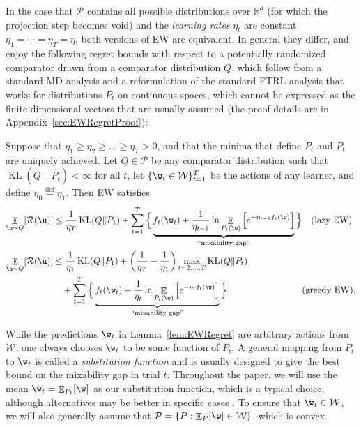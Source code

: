 \documentclass{colt2018} %
\DeclareMathOperator*{\E}{\mathbb{E}}
\DeclareMathOperator{\kl}{KL}
\newcommand{\reals}{\mathbb{R}}
\newcommand{\domainP}{\mathcal{P}}
\newcommand{\domainw}{\mathcal{W}}
\newcommand{\regret}{\mathcal{R}}
\begin{document}
% 
In the case that $\domainP$ contains all possible distributions over
$\reals^d$ (for which the projection step becomes void) and the
\emph{learning rates} $\eta_t$ are constant $\eta_1 = \cdots = \eta_T =
\eta$, both versions of EW are equivalent. In general they differ, and
enjoy the following regret bounds with respect to a potentially
randomized comparator drawn from a comparator distribution $Q$, which
follow from a standard MD analysis \citep{hazan2016introduction}
and a reformulation of the standard FTRL analysis that works for
distributions $P_t$ on continuous spaces, which cannot be expressed as
the finite-dimensional vectors that are usually assumed (the proof
details are in Appendix~\ref{sec:EWRegretProof}):
% 
\begin{lemma}[EW Regret]\label{lem:EWRegret}
  Suppose that $\eta_1 \geq  \eta_{2} \geq \ldots
  \geq \eta_T > 0$, and that the minima that define
  $\tilde{P}_t$ and $P_t$ are uniquely achieved. Let $Q \in \domainP$ be
  any comparator distribution such that $\kl(Q\|\tilde{P}_t) < \infty$
  for all $t$, let $\{\w_t \in \domainw\}_{t=1}^T$ be the actions of
  any learner, and define $\eta_0 \stackrel{\mathrm{def}}{=} \eta_1$. Then  EW satisfies
% 
\begin{align}
    \E_{\u \sim Q}[\regret(\u)]
      &\leq \frac{1}{\eta_T} \kl(Q \| P_1)
      + \sum_{t=1}^T \Big\{ \underbrace{f_t(\w_t) + \frac{1}{\eta_{t-1}}
          \ln \E_{P_t(\w)}\Big[e^{-\eta_{t-1}
        f_t(\w)}\Big]}_{\textnormal{``mixability gap''}}\Big\}
      && \textnormal{(lazy EW)}
    \label{eqn:EWRegret}\\
    \E_{\u \sim Q}[\regret(\u)]
      &\leq \frac{1}{\eta_1} \kl(Q \| P_1)
        + \left(\frac{1}{\eta_T}-\frac{1}{\eta_1}\right)\max_{t=2,\ldots,T} \kl(Q\|P_t)
        \nonumber \\
       &\quad+ \sum_{t=1}^T \Big\{ \underbrace{f_t(\w_t) + \frac{1}{\eta_t}
        \ln \E_{P_t(\w)}\Big[e^{-\eta_t
        f_t(\w)}\Big]}_{\textnormal{``mixability gap''}}\Big\}
    && \hspace{-1em}\textnormal{(greedy EW).}\label{eqn:EWRegret_greedy}
  \end{align}
\end{lemma}
% 
While the predictions $\w_t$ in Lemma~\ref{lem:EWRegret} are arbitrary
actions from $\domainw$, one always chooses $\w_t$ to be some function
of $P_t$. A general mapping from $P_t$ to $\w_t$ is called a
\emph{substitution function} \citep{Vovk2001} and is usually designed to
give the best bound on the mixability gap in trial $t$. 
Throughout the paper, we will use the mean $\w_t = \E_{P_t}[\w]$ as our
substitution function, which is a typical choice, although alternatives
may be better
in specific cases \citep{Vovk2001}. To
ensure that $\w_t \in \domainw$, we will also generally assume that
$\domainP = \{P : \E_P[\w] \in \domainw\}$, which is convex.
\end{document}
